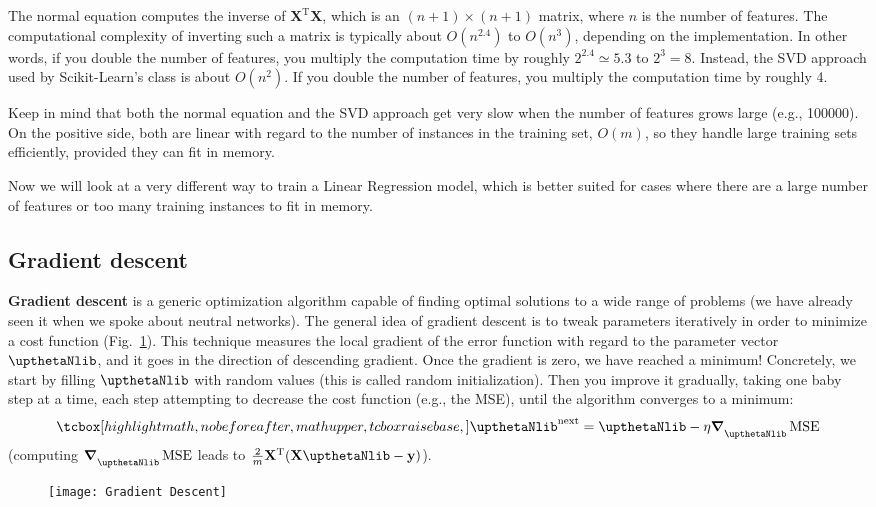 The normal equation computes the inverse of $\mathbf{X}^{\mathrm{T}}\mathbf{X}$, which is an $(n+1)\times(n+1)$ matrix, where $n$ is the number of features. The computational complexity of inverting such a matrix is typically about $O(n^{2.4})$ to $O(n^{3})$, depending on the implementation. In other words, if you double the number of features, you multiply the computation time by roughly $2^{2.4}\simeq5.3$ to $2^{3}=8$. Instead, the SVD approach used by Scikit-Learn's  class is about $O(n^{2})$. If you double the number of features, you multiply the computation time by roughly 4.

Keep in mind that both the normal equation and the SVD approach get very slow when the number of features grows large (e.g., \num{100000}). On the positive side, both are linear with regard to the number of instances in the training set, $O(m)$, so they handle large training sets efficiently, provided they can fit in memory.

Now we will look at a very different way to train a Linear Regression model, which is better suited for cases where there are a large number of features or too many training instances to fit in memory.
\subsection{Gradient descent}\label{subsec:Gradient_descent}
\textbf{Gradient descent} is a generic optimization algorithm capable of finding optimal solutions to a wide range of problems (we have already seen it when we spoke about neutral networks). The general idea of gradient descent is to tweak parameters iteratively in order to minimize a cost function (Fig.~\ref{GradientDescent}). This technique measures the local gradient of the error function with regard to the parameter vector $\boldtheta$, and it goes in the direction of descending gradient. Once the gradient is zero, we have reached a minimum! Concretely, we start by filling $\boldtheta$ with random values (this is called random initialization). Then you improve it gradually, taking one baby step at a time, each step attempting to decrease the cost function (e.g., the MSE), until the algorithm converges to a minimum:
\begin{equation}\label{eqn:GradientDescent}
\tcbhighmath{\boldtheta^{\text{next}}=\boldtheta-\eta\boldsymbol{\nabla}_{\boldtheta}\operatorname{MSE}}
\end{equation}
(computing $\boldsymbol{\nabla}_{\boldtheta}\operatorname{MSE}$ leads to $\frac{2}{m}\mathbf{X}^{\mathrm{T}}(\mathbf{X}\boldtheta-\mathbf{y})$).
\begin{figure}[h!t]
\centering
\texttt{[image: Gradient Descent]}
\caption{}\label{GradientDescent}
\end{figure}

